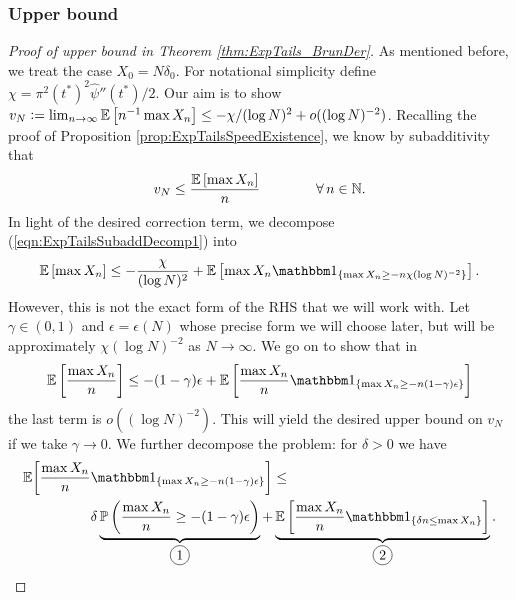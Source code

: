 \subsubsection{Upper bound}\label{subsec:upper_bound}
\begin{proof}[Proof of upper bound in Theorem \ref{thm:ExpTails_BrunDer}]
As mentioned before, we treat the case $X_0 = N \delta_0$. For notational simplicity define $\chi = \pi^2 (t^*)^2 \widehat{\psi}''(t^*) / 2$. Our aim is to show $v_N \vcentcolon= \lim_{n \to \infty} \mathbb{E}\left[ n^{-1} \max X_n \right] \leq -  \chi / (\log N)^2 + o((\log N)^{-2})$. Recalling the proof of Proposition \ref{prop:ExpTailsSpeedExistence}, we know by subadditivity that
\begin{equation}\label{eqn:ExpTailsSubaddDecomp1}
v_N \leq \frac{\mathbb{E}\left[ \max X_n \right]}{n} \qquad\qquad\forall\, n \in \mathbb{N}. 
\end{equation}
In light of the desired correction term, we decompose (\ref{eqn:ExpTailsSubaddDecomp1}) into
\begin{equation}\nonumber
\Ex{\max X_n} \leq - \frac{\chi}{(\log N)^2} + \Ex{\max X_n \Ind_{\{\max X_n \geq -n \chi (\log N)^{-2} \}}}. 
\end{equation}
However, this is not the exact form of the RHS that we will work with. Let $\gamma \in (0,1)$ and $\epsilon = \epsilon(N)$ whose precise form we will choose later, but will be approximately $\chi (\log N)^{-2}$ as $N \to \infty$. We go on to show that in
\begin{equation}\nonumber
\Ex{\frac{\max X_n}{n}} \leq  - (1 - \gamma)\epsilon + \Ex{\frac{\max X_n}{n} \Ind_{\{\max X_n \geq  -n (1 - \gamma) \epsilon \}}}
\end{equation}
the last term is $o((\log N)^{-2})$. This will yield the desired upper bound on $v_N$ if we take $\gamma \to 0$. We further decompose the problem: for $\delta > 0$ we have
\begin{align*} 
\E \bigg[\frac{\max X_n}{n} &\Ind_{\{\max X_n \geq - n (1 - \gamma)\epsilon \}}\bigg] \leq \\
							&\delta\underbrace{\Pr{\frac{\max X_n}{n} \geq -(1 - \gamma)\epsilon }}_{\circled{1}} + \underbrace{\Ex{\frac{\max X_n}{n} \Ind_{\{ \delta n \leq \max X_n \}}}}_{\circled{2}}. 
\end{align*}

\end{proof}
